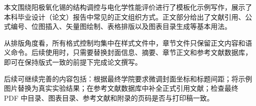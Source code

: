 
本文围绕阳极氧化锡的结构调控与电化学性能评价进行了模板化示例写作，展示了本科毕业设计（论文）报告中常见的正文组织方式。正文部分给出了文献引用、公式编号、位图插入、矢量图绘制、表格排版以及图表目录生成等基本用法。

从排版角度看，所有格式控制均集中在样式文件中，章节文件只保留正文内容和语义命令。后续使用时，只需要替换封面信息、摘要、章节正文和参考文献数据库，即可在保持版式一致的前提下完成论文撰写。

后续可继续完善的内容包括：根据最终学院要求微调封面坐标和标题间距；将示例图片替换为真实实验结果；在参考文献数据库中补全正式引用文献；检查最终 PDF 中目录、图表目录、参考文献和附录的页码是否与打印稿一致。
